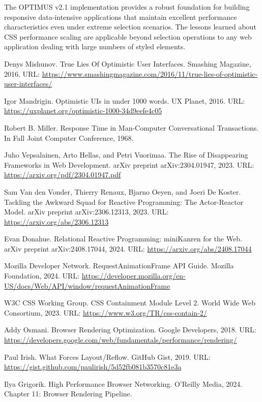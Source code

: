 \documentclass[10pt]{article}
\begin{document}
The OPTIMUS v2.1 implementation provides a robust foundation for building responsive data-intensive applications that maintain excellent performance characteristics even under extreme selection scenarios. The lessons learned about CSS performance scaling are applicable beyond selection operations to any web application dealing with large numbers of styled elements.


\begin{thebibliography}{99}
 Denys Mishunov. True Lies Of Optimistic User Interfaces. Smashing Magazine, 2016. URL: \url{https://www.smashingmagazine.com/2016/11/true-lies-of-optimistic-user-interfaces/}

 Igor Mandrigin. Optimistic UIs in under 1000 words. UX Planet, 2016. URL: \url{https://uxplanet.org/optimistic-1000-34d9eefe4c05}

 Robert B. Miller. Response Time in Man-Computer Conversational Transactions. In Fall Joint Computer Conference, 1968.

 Juho Vepsalainen, Arto Hellas, and Petri Vuorimaa. The Rise of Disappearing Frameworks in Web Development. arXiv preprint arXiv:2304.01947, 2023. URL: \url{https://arxiv.org/pdf/2304.01947.pdf}

 Sam Van den Vonder, Thierry Renaux, Bjarno Oeyen, and Joeri De Koster. Tackling the Awkward Squad for Reactive Programming: The Actor-Reactor Model. arXiv preprint arXiv:2306.12313, 2023. URL: \url{https://arxiv.org/abs/2306.12313}

 Evan Donahue. Relational Reactive Programming: miniKanren for the Web. arXiv preprint arXiv:2408.17044, 2024. URL: \url{https://arxiv.org/abs/2408.17044}

 Mozilla Developer Network. RequestAnimationFrame API Guide. Mozilla Foundation, 2024. URL: \url{https://developer.mozilla.org/en-US/docs/Web/API/window/requestAnimationFrame}

 W3C CSS Working Group. CSS Containment Module Level 2. World Wide Web Consortium, 2023. URL: \url{https://www.w3.org/TR/css-contain-2/}

 Addy Osmani. Browser Rendering Optimization. Google Developers, 2018. URL: \url{https://developers.google.com/web/fundamentals/performance/rendering/}

 Paul Irish. What Forces Layout/Reflow. GitHub Gist, 2019. URL: \url{https://gist.github.com/paulirish/5d52fb081b3570c81e3a}

 Ilya Grigorik. High Performance Browser Networking. O'Reilly Media, 2024. Chapter 11: Browser Rendering Pipeline.
\end{thebibliography}
\end{document}
